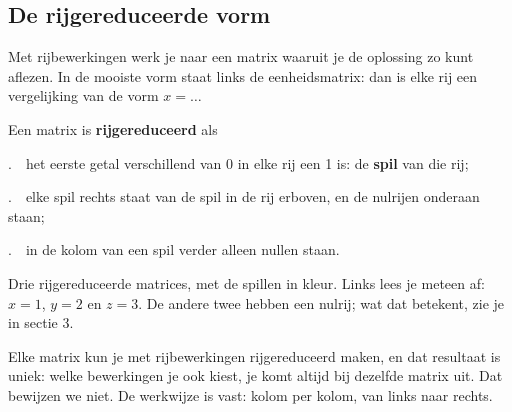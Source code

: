 \begin{oefeningen}
\end{oefeningen}

\subsection{De rijgereduceerde vorm}

Met rijbewerkingen werk je naar een matrix waaruit je de oplossing zo kunt aflezen. In de mooiste vorm staat links de eenheidsmatrix: dan is elke rij een vergelijking van de vorm $x = \ldots$

\begin{theorie}
Een matrix is \textbf{\textcolor{accent}{rijgereduceerd}} als

\vspace{1mm}
.\ \ het eerste getal verschillend van 0 in elke rij een 1 is: de \textbf{\textcolor{accent}{spil}} van die rij;

.\ \ elke spil rechts staat van de spil in de rij erboven, en de nulrijen onderaan staan;

.\ \ in de kolom van een spil verder alleen nullen staan.
\end{theorie}


Drie rijgereduceerde matrices, met de spillen in kleur. Links lees je meteen af: $x = 1$, $y = 2$ en $z = 3$. De andere twee hebben een nulrij; wat dat betekent, zie je in sectie 3.

\begin{oefeningen}
\end{oefeningen}

Elke matrix kun je met rijbewerkingen rijgereduceerd maken, en dat resultaat is uniek: welke bewerkingen je ook kiest, je komt altijd bij dezelfde matrix uit. Dat bewijzen we niet. De werkwijze is vast: kolom per kolom, van links naar rechts.

